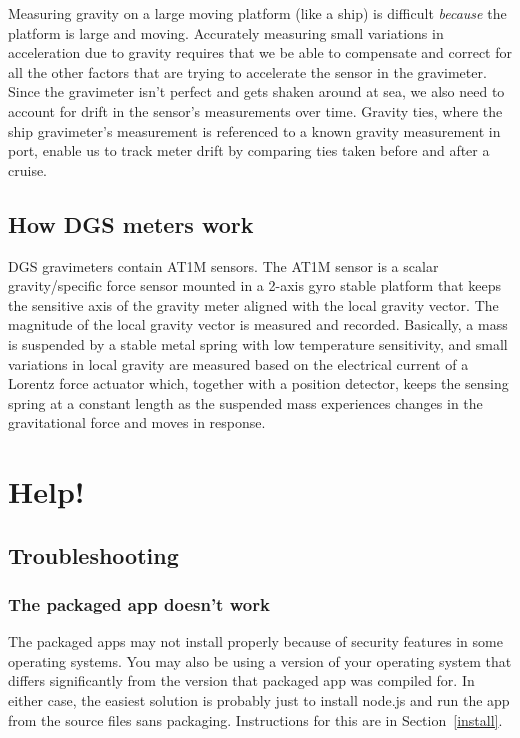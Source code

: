 \documentclass{pfpe-manual}
\begin{document}
Measuring gravity on a large moving platform (like a ship) is difficult \emph{because} the platform is large and moving. Accurately measuring small variations in acceleration due to gravity requires that we be able to compensate and correct for all the other factors that are trying to accelerate the sensor in the gravimeter. Since the gravimeter isn't perfect and gets shaken around at sea, we also need to account for drift in the sensor's measurements over time. Gravity ties, where the ship gravimeter's measurement is referenced to a known gravity measurement in port, enable us to track meter drift by comparing ties taken before and after a cruise. 

\subsection{How DGS meters work}
DGS gravimeters contain AT1M sensors. The AT1M sensor is a scalar gravity/specific force sensor mounted in a 2-axis gyro stable platform that keeps the sensitive axis of the gravity meter aligned with the local gravity vector. The magnitude of the local gravity vector is measured and recorded. Basically, a mass is suspended by a stable metal spring with low temperature sensitivity, and small variations in local gravity are measured based on the electrical current of a Lorentz force actuator which, together with a position detector, keeps the sensing spring at a constant length as the suspended mass experiences changes in the gravitational force and moves in response.

\section{Help!}
\label{helphelp}

\subsection{Troubleshooting}

\subsubsection{The packaged app doesn't work}
The packaged apps may not install properly because of security features in some operating systems. You may also be using a version of your operating system that differs significantly from the version that packaged app was compiled for. In either case, the easiest solution is probably just to install node.js and run the app from the source files sans packaging. Instructions for this are in Section~\ref{install}.
\end{document}
